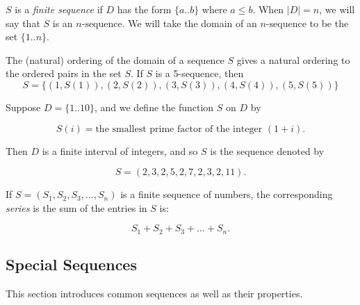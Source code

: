 \documentclass[
	12pt, %
	fleqn, %
	a4paper, %
]{LegrandOrangeBook}
\begin{document}
\( S \) is a \textit{finite sequence} if \( D \) has the form \( \{a..b\} \) where \( a \leq b \). When \( |D| = n \), we will say that \( S \) is an \( n\text{-sequence} \). We will take the domain of an \( n\text{-sequence} \) to be the set \( \{1..n\} \). %

The (natural) ordering of the domain of a sequence \( S \) gives a natural ordering to the ordered pairs in the set \( S \). If \( S \) is a 5-sequence, then
\[ S = \{(1, S(1)), (2, S(2)), (3, S(3)), (4, S(4)), (5, S(5))\} \]

\begin{example}
    Suppose \( D = \{1..10\} \), and we define the function \( S \) on \( D \) by

\[ S(i) = \text{the smallest prime factor of the integer } (1 + i). \]

Then \( D \) is a finite interval of integers, and so \( S \) is the sequence denoted by

\[ S = (2, 3, 2, 5, 2, 7, 2, 3, 2, 11). \]
\end{example}

\begin{definition}
    If \( S = (S_1, S_2, S_3, \ldots, S_n) \) is a finite sequence of numbers, the corresponding \textit{series} is the sum of the entries in \( S \)
    is:

\[ S_1 + S_2 + S_3 + \ldots + S_n. \]
\end{definition}
\subsection{Special Sequences}
This section introduces common sequences as well as their properties.
\end{document}
